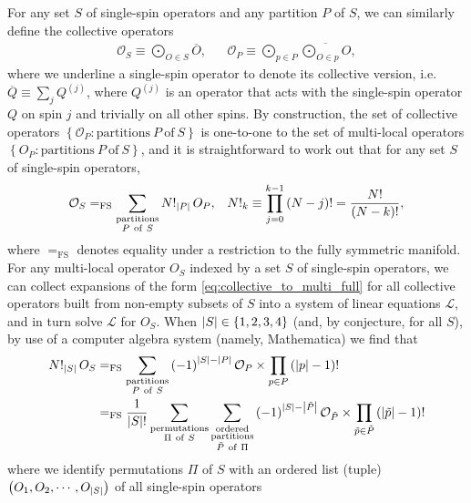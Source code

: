 \documentclass[nofootinbib,notitlepage,11pt]{revtex4-2}
\renewcommand{\t}{\text} %
\newcommand{\f}[2]{\dfrac{#1}{#2}} %
\newcommand{\p}[1]{\left(#1\right)} %
\renewcommand{\set}[1]{\left\{#1\right\}} %
\newcommand{\1}{\mathds{1}}
\renewcommand{\L}{\mathcal{L}}
\renewcommand{\O}{\mathcal{O}}
\renewcommand{\P}{\mathcal{P}}
\newcommand{\EQFS}{=_{\text{FS}}}
\newcommand{\col}{\overline}
\begin{document}
For any set $S$ of single-spin operators and any partition $P$ of $S$,
we can similarly define the collective operators
\begin{align}
  \O_S \equiv \bigodot_{O\in S} \col{O},
  &&
  \O_P \equiv \bigodot_{p\in P} \col{\textstyle\bigodot_{O\in p} O},
\end{align}
where we underline a single-spin operator to denote its collective
version, i.e.~$\col{Q}\equiv\sum_j Q^{(j)}$, where $Q^{(j)}$ is an
operator that acts with the single-spin operator $Q$ on spin $j$ and
trivially on all other spins.  By construction, the set of collective
operators $\set{\O_P:\t{partitions}~P~\t{of}~S}$ is one-to-one to the
set of multi-local operators $\set{O_P:\t{partitions}~P~\t{of}~S}$,
and it is straightforward to work out that for any set $S$ of
single-spin operators,
\begin{align}
  \O_S
  \EQFS \sum_{\substack{\t{partitions}\\P~\t{of}~S}}
  N!_{\abs{P}}\, O_P,
  &&
  N!_k \equiv \prod_{j=0}^{k-1}\p{N-j}! = \f{N!}{\p{N-k}!},
  \label{eq:collective_to_multi_full}
\end{align}
where $\EQFS$ denotes equality under a restriction to the fully
symmetric manifold.  For any multi-local operator $O_S$ indexed by a
set $S$ of single-spin operators, we can collect expansions of the
form \eqref{eq:collective_to_multi_full} for all collective operators
built from non-empty subsets of $S$ into a system of linear equations
$\L$, and in turn solve $\L$ for $O_S$.  When
$\abs{S}\in\set{1,2,3,4}$ (and, by conjecture, for all $S$), by use of
a computer algebra system (namely, Mathematica) we find that
\begin{align}
  N!_{\abs{S}}\, O_S
  &\EQFS \sum_{\substack{\t{partitions}\\P~\t{of}~S}}
  \p{-1}^{\abs{S}-\abs{P}} \O_P \times \prod_{p\in P}\p{\abs{p}-1}!
  \label{eq:multi_to_collective_full} \\
  &\EQFS \f1{\abs{S}!} \sum_{\substack{\t{permutations}\\\Pi~\t{of}~S}}
  \sum_{\substack{\t{ordered}\\\t{partitions}\\\tilde P~\t{of}~\Pi}}
  \p{-1}^{\abs{S}-\abs{\tilde P}} \O_{\tilde P}
  \times \prod_{\tilde p\in\tilde P} \p{\abs{\tilde p}-1}!
  \label{eq:multi_to_collective_full_simp}
\end{align}
where we identify permutations $\Pi$ of $S$ with an ordered list
(tuple) $\p{O_1,O_2,\cdots,O_{\abs{S}}}$ of all single-spin operators
\end{document}
